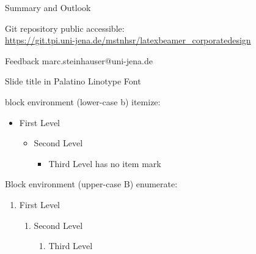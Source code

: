 \documentclass[10pt,aspectratio=43]{beamer}
\begin{document}
	\begin{frame}{Summary and Outlook}
		\begin{Block}{Git repository}
			public accessible:\\
			{\scriptsize\url{https://git.tpi.uni-jena.de/mstnhsr/latexbeamer_corporatedesign}}
		\end{Block}
		\begin{Block}{Feedback}
			marc.steinhauser@uni-jena.de
		\end{Block}
	\end{frame}
	
	
	
	\begin{frame}{Slide title in Palatino Linotype Font}
		\begin{block}{block environment (lower-case b)}
			itemize:
			\begin{itemize}
				\item First Level
				\begin{itemize}
					\item Second Level
					\begin{itemize}
						\item Third Level has no item mark
					\end{itemize}
				\end{itemize}
			\end{itemize}
		\end{block}
		\begin{Block}{Block environment (upper-case B)}
			enumerate:
			\begin{enumerate}
				\item First Level
				\begin{enumerate}
					\item Second Level
					\begin{enumerate}
						\item Third Level
					\end{enumerate}
				\end{enumerate}
			\end{enumerate}
		\end{Block}
	\end{frame}
\end{document}
